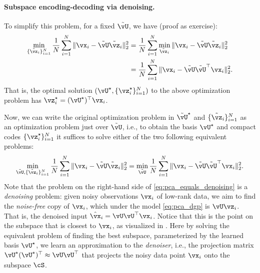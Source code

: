 \documentclass[../../book-main.tex]{subfiles}
\begin{document}
\paragraph{Subspace encoding-decoding via denoising.}
To simplify this problem, for a fixed \(\tilde{\vU}\), we have (proof as exercise):
\begin{align}
    \min_{\{\tilde{\vz}_{i}\}_{i = 1}^{N}}\frac{1}{N}\sum_{i = 1}^{N}\norm{\vx_{i} - \tilde{\vU}\tilde{\vz}_{i}}_{2}^{2} 
    &= \frac{1}{N}\sum_{i = 1}^{N}\min_{\tilde{\vz}_{i}}\norm{\vx_{i} - \tilde{\vU}\tilde{\vz}_{i}}_{2}^{2} \\
    &= \frac{1}{N}\sum_{i = 1}^{N}\norm{\vx_{i} - \tilde{\vU}\tilde{\vU}^{\top}\vx_{i}}_{2}^{2}. 
\end{align}
That is, the optimal solution \((\vU^{\star}, \{\vz_{i}^{\star}\}_{i = 1}^{N})\)
to the above optimization problem has $\vz_i^{\star} = (\vU^{\star})^\top\vx_i$.

Now, we can write the original optimization problem in \(\tilde{\vU}^{\star}\)
and \(\{\tilde{\vz}_{i}\}_{i = 1}^{N}\) as an optimization problem just over
\(\tilde{\vU}\), i.e., to obtain the basis \(\vU^{\star}\) and compact codes
\(\{\vz_{i}^{\star}\}_{i = 1}^{N}\) it suffices to solve either of the two following equivalent problems:
\begin{equation}\label{eq:pca_equals_denoising}
    \min_{\tilde{\vU}, \{\tilde{\vz}_{i}\}_{i = 1}^{N}}\frac{1}{N}\sum_{i = 1}^{N}\norm{\vx_{i} - \tilde{\vU}\tilde{\vz}_{i}}_{2}^{2} = \min_{\tilde{\vU}}\frac{1}{N}\sum_{i = 1}^{N}\norm{\vx_{i} - \tilde{\vU}\tilde{\vU}^{\top}\vx_{i}}_{2}^{2}.
\end{equation}
Note that the problem on the right-hand side of \eqref{eq:pca_equals_denoising}
is a \textit{denoising} problem: given noisy observations \(\vx_{i}\) of
low-rank data, we aim to find the \textit{noise-free} copy of \(\vx_{i}\), which
under the model \eqref{eq:pca_dgp} is $\vU\vz_{i}$. That is, the denoised input
$\hat{\vx}_i = \vU\vU^\top \vx_i$. Notice that this is the point on the subspace
that is closest to $\vx_i$, as visualized in . Here by
solving the equivalent problem of finding the best subspace, parameterized by
the learned basis \(\vU^{\star}\), we learn an approximation to the
\textit{denoiser}, i.e., the projection matrix \(\vU^{\star}(\vU^{\star})^{\top} \approx \vU\vU^{\top}\) that projects the noisy data point $\vx_i$ onto the subspace \(\cS\). %
\end{document}
